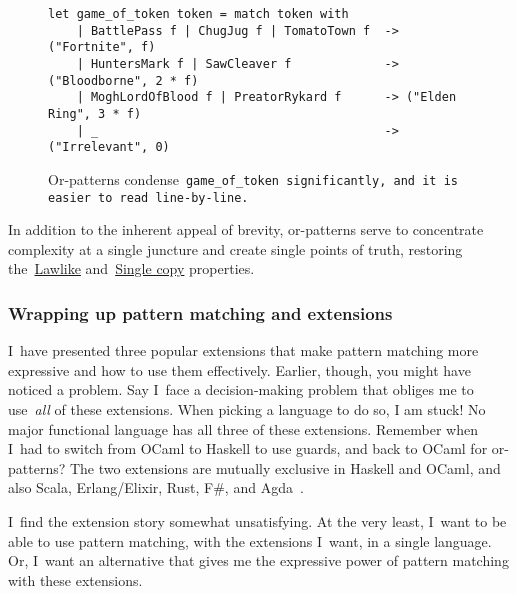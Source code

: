 \documentclass[manuscript,screen 12pt, nonacm]{acmart}
\begin{document}
    \begin{figure}
    \begin{center}
    \begin{verbatim}
let game_of_token token = match token with 
    | BattlePass f | ChugJug f | TomatoTown f  -> ("Fortnite", f)
    | HuntersMark f | SawCleaver f             -> ("Bloodborne", 2 * f)
    | MoghLordOfBlood f | PreatorRykard f      -> ("Elden Ring", 3 * f)
    | _                                        -> ("Irrelevant", 0)
    \end{verbatim}
    \end{center}    
    \caption{Or-patterns condense~\tt{game\_of\_token}
    significantly, and it is easier to read line-by-line.} 
    \label{fig:orgot}
    \end{figure}

    In addition to the inherent appeal of brevity, or-patterns serve to
    concentrate complexity at a single juncture and create single points of
    truth, restoring the~\hyperref[p1]{Lawlike} and~\hyperref[p2]{Single copy}
    properties. 
    
      
    \subsubsection{Wrapping up pattern matching and extensions}
    
    I~have presented three popular extensions that make pattern matching more
    expressive and how to use them effectively. Earlier, though, you might have
    noticed a problem. Say I~face a decision-making problem that obliges me to
    use~\emph{all} of these extensions. When picking a language to do so, I am
    stuck! No major functional language has all three of these extensions.
    Remember when I~had to switch from OCaml to Haskell to use guards, and back
    to OCaml for or-patterns? The two extensions are mutually exclusive in
    Haskell and OCaml, and also Scala, Erlang/Elixir, Rust, F\#, and
    Agda~\citep{haskell, ocaml, scala, erlang, elixir, rust, fsharp, agda}. 


    I~find the extension story somewhat unsatisfying. At the very least, I~want
    to be able to use pattern matching, with the extensions I~want, in a single
    language. Or, I~want an alternative that gives me the expressive power of
    pattern matching with these extensions. 
\end{document}
